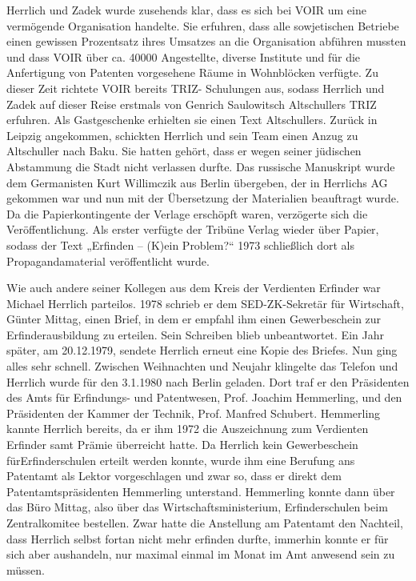 \documentclass[11pt,a4paper]{article}
\begin{document}
Herrlich und Zadek wurde zusehends klar, dass es sich bei VOIR um eine
vermögende Organisation handelte. Sie erfuhren, dass alle sowjetischen
Betriebe einen gewissen Prozentsatz ihres Umsatzes an die Organisation
abführen mussten und dass VOIR über ca. 40000 Angestellte, diverse Institute
und für die Anfertigung von Patenten vorgesehene Räume in Wohnblöcken
verfügte. Zu dieser Zeit richtete VOIR bereits TRIZ- Schulungen aus, sodass
Herrlich und Zadek auf dieser Reise erstmals von Genrich Saulowitsch
Altschullers TRIZ erfuhren. Als Gastgeschenke erhielten sie einen Text
Altschullers. Zurück in Leipzig angekommen, schickten Herrlich und sein Team
einen Anzug zu Altschuller nach Baku. Sie hatten gehört, dass er wegen seiner
jüdischen Abstammung die Stadt nicht verlassen durfte. Das russische
Manuskript wurde dem Germanisten Kurt Willimczik aus Berlin übergeben, der in
Herrlichs AG gekommen war und nun mit der Übersetzung der Materialien
beauftragt wurde. Da die Papierkontingente der Verlage erschöpft waren,
verzögerte sich die Veröffentlichung. Als erster verfügte der Tribüne Verlag
wieder über Papier, sodass der Text „Erfinden – (K)ein Problem?“ 1973
schließlich dort als Propagandamaterial veröffentlicht wurde.

Wie auch andere seiner Kollegen aus dem Kreis der Verdienten Erfinder war
Michael Herrlich parteilos. 1978 schrieb er dem SED-ZK-Sekretär für
Wirtschaft, Günter Mittag, einen Brief, in dem er empfahl ihm einen
Gewerbeschein zur Erfinderausbildung zu erteilen. Sein Schreiben blieb
unbeantwortet. Ein Jahr später, am 20.12.1979, sendete Herrlich erneut eine
Kopie des Briefes. Nun ging alles sehr schnell. Zwischen Weihnachten und
Neujahr klingelte das Telefon und Herrlich wurde für den 3.1.1980 nach Berlin
geladen. Dort traf er den Präsidenten des Amts für Erfindungs- und
Patentwesen, Prof. Joachim Hemmerling, und den Präsidenten der Kammer der
Technik, Prof. Manfred Schubert. Hemmerling kannte Herrlich bereits, da er ihm
1972 die Auszeichnung zum Verdienten Erfinder samt Prämie überreicht hatte. Da
Herrlich kein Gewerbeschein fürErfinderschulen erteilt werden konnte, wurde
ihm eine Berufung ans Patentamt als Lektor vorgeschlagen und zwar so, dass er
direkt dem Patentamtspräsidenten Hemmerling unterstand. Hemmerling konnte dann
über das Büro Mittag, also über das Wirtschaftsministerium, Erfinderschulen
beim Zentralkomitee bestellen. Zwar hatte die Anstellung am Patentamt den
Nachteil, dass Herrlich selbst fortan nicht mehr erfinden durfte, immerhin
konnte er für sich aber aushandeln, nur maximal einmal im Monat im Amt
anwesend sein zu müssen.
\end{document}
